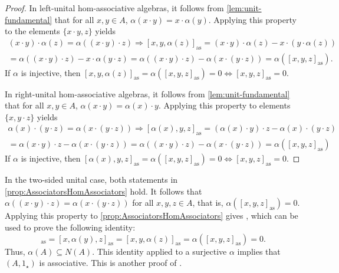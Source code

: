 \documentclass[12pt]{article}
\begin{document}
		\begin{proof}
			In left-unital hom-associative algebras, it follows from \cref{lem:unit-fundamental} that for all $x,y\in A$,  $\alpha(x\cdot y)=x\cdot \alpha(y)$. Applying this property to the elements $\{x\cdot y,z\}$ yields
			\begin{multline*}
				(x\cdot y)\cdot \alpha(z)=\alpha((x\cdot y)\cdot z)\Rightarrow [x,y,\alpha(z)]_{\mathrm{as}}=(x\cdot y)\cdot \alpha(z)-x\cdot (y\cdot \alpha(z))\\
				=\alpha((x\cdot y)\cdot z)-x\cdot \alpha(y\cdot z)
				=\alpha((x\cdot y)\cdot z)-\alpha(x\cdot (y\cdot z))=
				\alpha([x,y,z]_{\mathrm{as}}).
			\end{multline*}
			If $\alpha$ is injective, then $[x,y,\alpha(z)]_{\mathrm{as}}=\alpha([x,y,z]_{\mathrm{as}})=0\Leftrightarrow [x,y,z]_{\mathrm{as}}=0$.
			
			In right-unital hom-associative algebras, it follows from \cref{lem:unit-fundamental} that for all $x,y\in A$, $\alpha(x\cdot y)=\alpha(x)\cdot y$. Applying this property to elements $\{x,y\cdot z\}$ yields
			\begin{multline*}
				\alpha(x)\cdot (y\cdot z)=\alpha(x\cdot (y\cdot z))\Rightarrow [\alpha(x),y,z]_{\mathrm{as}}=(\alpha(x)\cdot y)\cdot z-\alpha(x)\cdot (y\cdot z)\\
				=\alpha(x\cdot y)\cdot z-\alpha(x\cdot (y\cdot z))
				=\alpha((x\cdot y)\cdot z)-\alpha(x\cdot (y\cdot z))=
				\alpha([x,y,z]_{\mathrm{as}})
			\end{multline*}
			If $\alpha$ is injective, then $[\alpha(x),y,z]_{\mathrm{as}}=\alpha([x,y,z]_{\mathrm{as}})=0\Leftrightarrow [x,y,z]_{\mathrm{as}}=0$.
		\end{proof}
		In the two-sided unital case, both statements in \cref{prop:AssociatorsHomAssociators} hold. It follows that $\alpha((x\cdot y)\cdot z)=\alpha(x\cdot (y\cdot z))$ for all $x,y,z\in A$, that is, $\alpha([x,y,z]_{\mathrm{as}})=0$. Applying this property to \cref{prop:AssociatorsHomAssociators} gives \cite[Proposition 1.1]{FreGohr:UnitCond}, which can be used to prove the following identity:
		\begin{equation*}
			[\alpha(x),y,z]_{\mathrm{as}}=[x,\alpha(y),z]_{\mathrm{as}}=[x,y,\alpha(z)]_{\mathrm{as}}=\alpha([x,y,z]_{\mathrm{as}})=0.
		\end{equation*}
		Thus, $\alpha(A)\subseteq N(A)$.
		This identity applied to a surjective $\alpha$ implies that $(A,1_\star)$ is associative. This is another proof of  \cite[Corollary 1.1]{FreGohr:UnitCond}.
		
\end{document}
